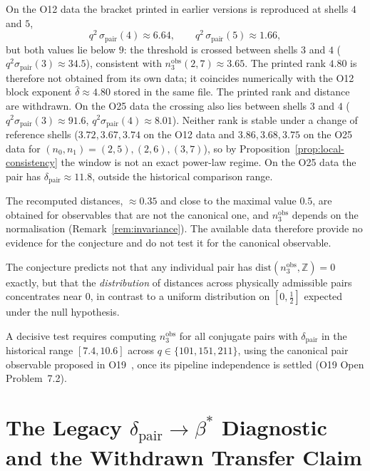 \documentclass[11pt,a4paper]{article}
\theoremstyle{definition}
\theoremstyle{remark}
\begin{document}
    On the O12 data the bracket printed in earlier versions is reproduced at shells $4$ and $5$,
    \[
      q^2\,\sigma_{\mathrm{pair}}(4) \approx 6.64,
      \qquad
      q^2\,\sigma_{\mathrm{pair}}(5) \approx 1.66,
    \]
    but both values lie below $9$: the threshold is crossed between shells $3$ and $4$
    ($q^2\sigma_{\mathrm{pair}}(3)\approx34.5$), consistent with $n_3^{\mathrm{obs}}(2,7)\approx3.65$.
    The printed rank $4.80$ is therefore not obtained from its own data; it coincides numerically with the
    O12 block exponent $\hat\delta \approx 4.80$ stored in the same file.
    The printed rank and distance are withdrawn.
    On the O25 data the crossing also lies between shells $3$ and $4$
    ($q^2\sigma_{\mathrm{pair}}(3)\approx91.6$, $q^2\sigma_{\mathrm{pair}}(4)\approx8.01$).
    Neither rank is stable under a change of reference shells ($3.72, 3.67, 3.74$ on the O12 data and
    $3.86, 3.68, 3.75$ on the O25 data for $(n_0,n_1) = (2,5), (2,6), (3,7)$), so by
    Proposition~\ref{prop:local-consistency} the window is not an exact power-law regime.
    On the O25 data the pair has $\delta_{\mathrm{pair}} \approx 11.8$, outside the historical comparison
    range.

    The recomputed distances, $\approx 0.35$ and close to the maximal value $0.5$, are obtained for
    observables that are not the canonical one, and $n_3^{\mathrm{obs}}$ depends on the normalisation
    (Remark~\ref{rem:invariance}).
    The available data therefore provide no evidence for the conjecture and do not test it for the
    canonical observable.

    The conjecture predicts not that any individual pair has
    $\mathrm{dist}(n_3^{\mathrm{obs}}, \mathbb{Z}) = 0$
    exactly, but that the \emph{distribution} of distances
    across physically admissible pairs concentrates near $0$,
    in contrast to a uniform distribution on $[0, \tfrac{1}{2}]$
    expected under the null hypothesis.

    A decisive test requires computing
    $n_3^{\mathrm{obs}}$ for all conjugate pairs with
    $\delta_{\mathrm{pair}}$ in the historical range $[7.4,10.6]$ across
    $q \in \{101, 151, 211\}$, using the canonical pair
    observable proposed in O19~\cite{Beau2026a23}, once its pipeline independence is settled (O19 Open Problem~7.2).

  \section{The Legacy $\delta_{\mathrm{pair}} \to \beta^*$
  Diagnostic and the Withdrawn Transfer Claim}
  \label{sec:transfer}
\end{document}
